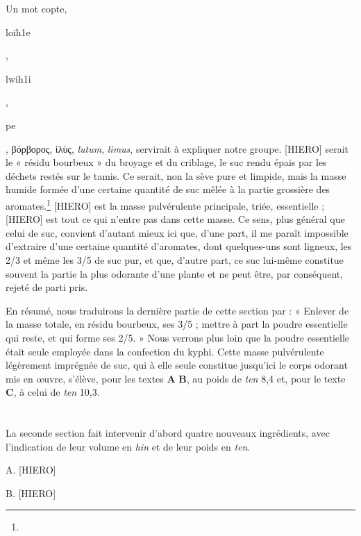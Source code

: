 \documentclass[a4paper, 11pt, oneside]{article}
\begin{document}
Un mot copte, \begin{coptic}loih1e\end{coptic}, \begin{coptic}lwih1i\end{coptic}, \begin{coptic}pe\end{coptic}, βόρβορος, ἰλὺς, \emph{lutum}, \emph{limus}, servirait à expliquer notre groupe. [HIERO] serait le « résidu bourbeux » du broyage et du criblage, le suc rendu épais par les déchets restés sur le tamis. Ce serait, non la sève pure et limpide, mais la masse humide formée d'une certaine quantité de suc mêlée à la partie grossière des aromates.\footnote{} [HIERO] est la masse pulvérulente principale, triée, essentielle ; [HIERO] est tout ce qui n'entre pas dans cette masse. Ce sens, plus général que celui de suc, convient d'autant mieux ici que, d'une part, il me paraît impossible d'extraire d'une certaine quantité d'aromates, dont quelques-uns sont ligneux, les 2/3 et même les 3/5 de suc pur, et que, d'autre part, ce suc lui-même constitue souvent la partie la plus odorante d'une plante et ne peut être, par conséquent, rejeté de parti pris.


En résumé, nous traduirons la dernière partie de cette section par : « Enlever de la masse totale, en résidu bourbeux, ses 3/5 ; mettre à part la poudre essentielle qui reste, et qui forme ses 2/5. » Nous verrons plus loin que la poudre essentielle était seule employée dans la confection du kyphi. Cette masse pulvérulente légèrement imprégnée de suc, qui à elle seule constitue jusqu'ici le corps odorant mis en œuvre, s'élève, pour les textes \textbf{A} \textbf{B}, au poids de \emph{ten} 8,4 et, pour le texte \textbf{C}, à celui de \emph{ten} 10,3.
\clearpage
\section{}
\paragraph{}
La seconde section fait intervenir d'abord quatre nouveaux ingrédients, avec l'indication de leur volume en \emph{hin} et de leur poids en \emph{ten}.

A. [HIERO]

B. [HIERO]
\end{document}
